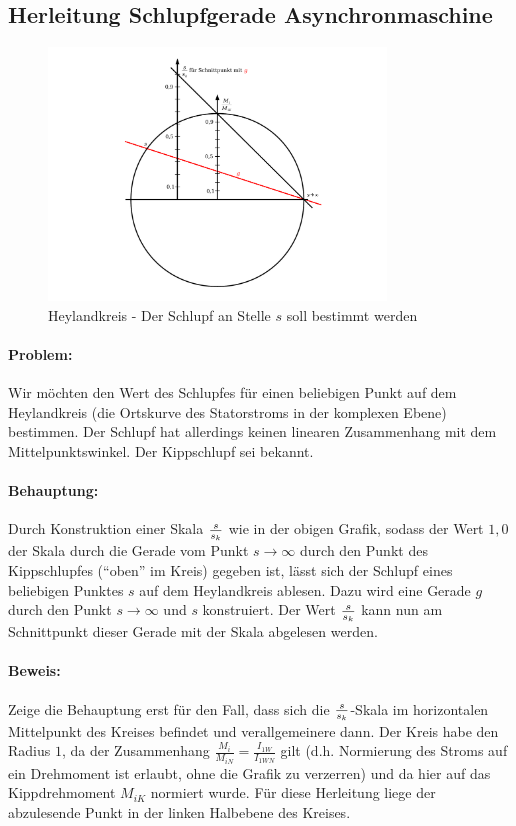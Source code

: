 \documentclass[a4paper, 11pt]{article}
\begin{document}
\subsection{Herleitung Schlupfgerade Asynchronmaschine} \label{ssec:appendix_asm_slip}
\begin{figure}[h]
	\centering
	\includegraphics[width=0.8\textwidth]{img/asynchronmaschine_schlupfgerade_verschoben.pdf}
	\caption*{Heylandkreis - Der Schlupf an Stelle $s$ soll bestimmt werden}
\end{figure}

\paragraph{Problem:} Wir möchten den Wert des Schlupfes für einen beliebigen Punkt auf dem Heylandkreis (die Ortskurve des Statorstroms in der komplexen Ebene) bestimmen. Der Schlupf hat allerdings keinen linearen Zusammenhang mit dem Mittelpunktswinkel. Der Kippschlupf sei bekannt.

\paragraph{Behauptung:} Durch Konstruktion einer Skala $s \over s_k$ wie in der obigen Grafik, sodass der Wert $1,0$ der Skala durch die Gerade vom Punkt $s \to \infty$ durch den Punkt des Kippschlupfes (``oben'' im Kreis) gegeben ist, lässt sich der Schlupf eines beliebigen Punktes $s$ auf dem Heylandkreis ablesen. Dazu wird eine Gerade $g$ durch den Punkt $s \to \infty$ und $s$ konstruiert. Der Wert $s \over s_k$ kann nun am Schnittpunkt dieser Gerade mit der Skala abgelesen werden.

\paragraph{Beweis: } Zeige die Behauptung erst für den Fall, dass sich die $s \over s_k$-Skala im horizontalen Mittelpunkt des Kreises befindet und verallgemeinere dann. Der Kreis habe den Radius $1$, da der Zusammenhang $\frac{M_i}{M_{iN}} = \frac{I_{1W}}{I_{1WN}}$ gilt (d.h. Normierung des Stroms auf ein Drehmoment ist erlaubt, ohne die Grafik zu verzerren) und da hier auf das Kippdrehmoment $M_{iK}$ normiert wurde. Für diese Herleitung liege der abzulesende Punkt in der linken Halbebene des Kreises.
\end{document}
